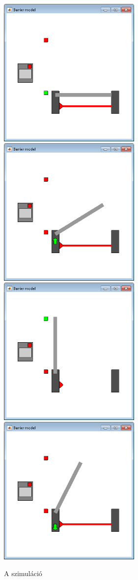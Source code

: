 \begin{figure}
\centering
\includegraphics[width=70mm, keepaspectratio]{figures/2m03/b2_sim1.png}\vspace{2mm}
\includegraphics[width=70mm, keepaspectratio]{figures/2m03/b2_sim2.png}\hspace{2mm}
\includegraphics[width=70mm, keepaspectratio]{figures/2m03/b2_sim3.png}\vspace{2mm}
\includegraphics[width=70mm, keepaspectratio]{figures/2m03/b2_sim4.png}
\caption{A szimuláció}
\label{fig:Sim}
\end{figure}